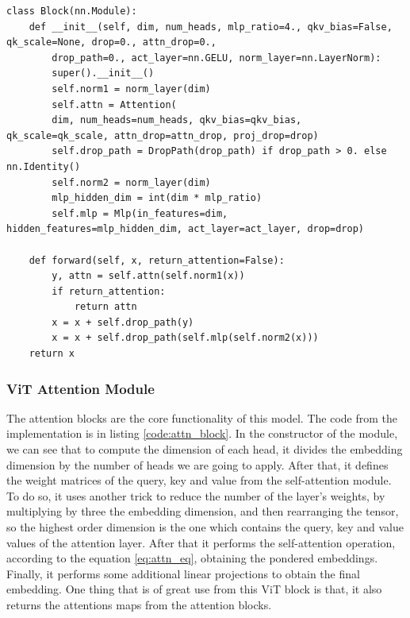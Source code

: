 \begin{lstlisting}[caption={ViT blocks implementation}, label={code:vit_block_implementation}]
class Block(nn.Module):
	def __init__(self, dim, num_heads, mlp_ratio=4., qkv_bias=False, qk_scale=None, drop=0., attn_drop=0.,
		drop_path=0., act_layer=nn.GELU, norm_layer=nn.LayerNorm):
		super().__init__()
		self.norm1 = norm_layer(dim)
		self.attn = Attention(
		dim, num_heads=num_heads, qkv_bias=qkv_bias, qk_scale=qk_scale, attn_drop=attn_drop, proj_drop=drop)
		self.drop_path = DropPath(drop_path) if drop_path > 0. else nn.Identity()
		self.norm2 = norm_layer(dim)
		mlp_hidden_dim = int(dim * mlp_ratio)
		self.mlp = Mlp(in_features=dim, hidden_features=mlp_hidden_dim, act_layer=act_layer, drop=drop)
	
	def forward(self, x, return_attention=False):
		y, attn = self.attn(self.norm1(x))
		if return_attention:
			return attn
		x = x + self.drop_path(y)
		x = x + self.drop_path(self.mlp(self.norm2(x)))
	return x
\end{lstlisting}

\subsubsection{ViT Attention Module}
The attention blocks are the core functionality of this model. The code from the implementation is in listing \ref{code:attn_block}. In the constructor of the module, we can see that to compute the dimension of each head, it divides the embedding dimension by the number of heads we are going to apply. After that, it defines the weight matrices of the query, key and value from the self-attention module. To do so, it uses another trick to reduce the number of the layer's weights, by multiplying by three the embedding dimension, and then rearranging the tensor, so the highest order dimension is the one which contains the query, key and value values of the attention layer. After that it performs the self-attention operation, according to the equation \ref{eq:attn_eq}, obtaining the pondered embeddings. Finally, it performs some additional linear projections to obtain the final embedding. One thing that is of great use from this ViT block is that, it also returns the attentions maps from the attention blocks.

